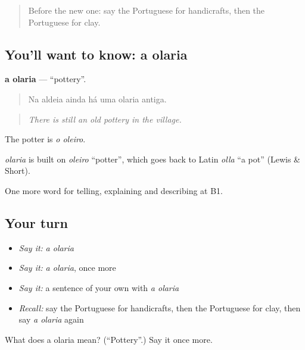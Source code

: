 \label{lesson:PT-C504-olaria}



\begin{quote}
Before the new one: say the Portuguese for handicrafts, then the Portuguese for clay.
\end{quote}

\subsection*{You'll want to know: a olaria}
\textbf{a olaria} — \textquotedblleft{}pottery\textquotedblright{}.

\begin{quote}
Na aldeia ainda há uma olaria antiga.
\end{quote}

\begin{quote}
\emph{There is still an old pottery in the village.}
\end{quote}

The potter is \emph{o oleiro}.

\begin{cousinweb}
\emph{olaria} is built on \emph{oleiro} \textquotedblleft{}potter\textquotedblright{}, which goes back to Latin \emph{olla} \textquotedblleft{}a pot\textquotedblright{} (Lewis \& Short).
\end{cousinweb}

\begin{grammarlens}[title={What you've built}]
One more word for telling, explaining and describing at B1.
\end{grammarlens}

\subsection*{Your turn}
\begin{itemize}
\raggedright
  \item \emph{Say it:} \emph{a olaria}
  \item \emph{Say it:} \emph{a olaria}, once more
  \item \emph{Say it:} a sentence of your own with \emph{a olaria}
  \item \emph{Recall:} say the Portuguese for handicrafts, then the Portuguese for clay, then say \emph{a olaria} again
\end{itemize}

\begin{tcolorbox}[breakable,colback=teal!4,colframe=teal!35!black,title={Before you move on}]
What does a olaria mean? (\textquotedblleft{}Pottery\textquotedblright{}.) Say it once more.
\end{tcolorbox}
